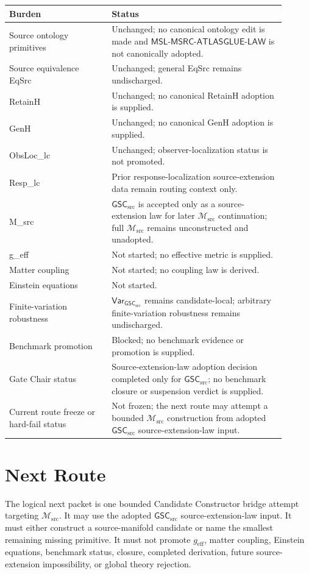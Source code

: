 \documentclass[11pt]{article}
\newcommand{\Msrc}{\mathcal{M}_{\mathrm{src}}}
\newcommand{\geff}{g_{\mathrm{eff}}}
\newcommand{\MSL}{\mathsf{MSL}\mbox{-}\mathsf{MSRC}\mbox{-}\mathsf{ATLASGLUE}\mbox{-}\mathsf{LAW}}
\newcommand{\GSC}{\mathsf{GSC}_{\mathrm{src}}}
\newcommand{\Vargsc}{\mathsf{Var}_{\GSC}}
\begin{document}
\begin{center}
\begin{tabular}{p{0.33\linewidth}p{0.57\linewidth}}
\hline
Burden & Status \\
\hline
Source ontology primitives & Unchanged; no canonical ontology edit is made and \(\MSL\) is not canonically adopted. \\
Source equivalence EqSrc & Unchanged; general EqSrc remains undischarged. \\
RetainH & Unchanged; no canonical RetainH adoption is supplied. \\
GenH & Unchanged; no canonical GenH adoption is supplied. \\
ObsLoc\_lc & Unchanged; observer-localization status is not promoted. \\
Resp\_lc & Prior response-localization source-extension data remain routing context only. \\
M\_src & \(\GSC\) is accepted only as a source-extension law for later \(\Msrc\) continuation; full \(\Msrc\) remains unconstructed and unadopted. \\
g\_eff & Not started; no effective metric is supplied. \\
Matter coupling & Not started; no coupling law is derived. \\
Einstein equations & Not started. \\
Finite-variation robustness & \(\Vargsc\) remains candidate-local; arbitrary finite-variation robustness remains undischarged. \\
Benchmark promotion & Blocked; no benchmark evidence or promotion is supplied. \\
Gate Chair status & Source-extension-law adoption decision completed only for \(\GSC\); no benchmark closure or suspension verdict is supplied. \\
Current route freeze or hard-fail status & Not frozen; the next route may attempt a bounded \(\Msrc\) construction from adopted \(\GSC\) source-extension-law input. \\
\hline
\end{tabular}
\end{center}

\section{Next Route}

The logical next packet is one bounded Candidate Constructor bridge attempt
targeting \(\Msrc\). It may use the adopted \(\GSC\) source-extension-law
input. It must either construct a source-manifold candidate or name the
smallest remaining missing primitive. It must not promote \(\geff\), matter
coupling, Einstein equations, benchmark status, closure, completed
derivation, future source-extension impossibility, or global theory rejection.
\end{document}

